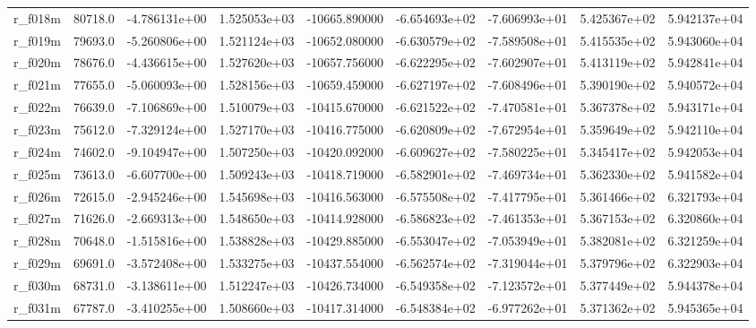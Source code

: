 \documentclass[10pt]{article}
\begin{document}
\begin{landscape}
\begin{longtable}{lrrrrrrrr}
r\_f018m                 &   80718.0 & -4.786131e+00 &  1.525053e+03 & -10665.890000 & -6.654693e+02 & -7.606993e+01 &  5.425367e+02 &  5.942137e+04 \\
r\_f019m                 &   79693.0 & -5.260806e+00 &  1.521124e+03 & -10652.080000 & -6.630579e+02 & -7.589508e+01 &  5.415535e+02 &  5.943060e+04 \\
r\_f020m                 &   78676.0 & -4.436615e+00 &  1.527620e+03 & -10657.756000 & -6.622295e+02 & -7.602907e+01 &  5.413119e+02 &  5.942841e+04 \\
r\_f021m                 &   77655.0 & -5.060093e+00 &  1.528156e+03 & -10659.459000 & -6.627197e+02 & -7.608496e+01 &  5.390190e+02 &  5.940572e+04 \\
r\_f022m                 &   76639.0 & -7.106869e+00 &  1.510079e+03 & -10415.670000 & -6.621522e+02 & -7.470581e+01 &  5.367378e+02 &  5.943171e+04 \\
r\_f023m                 &   75612.0 & -7.329124e+00 &  1.527170e+03 & -10416.775000 & -6.620809e+02 & -7.672954e+01 &  5.359649e+02 &  5.942110e+04 \\
r\_f024m                 &   74602.0 & -9.104947e+00 &  1.507250e+03 & -10420.092000 & -6.609627e+02 & -7.580225e+01 &  5.345417e+02 &  5.942053e+04 \\
r\_f025m                 &   73613.0 & -6.607700e+00 &  1.509243e+03 & -10418.719000 & -6.582901e+02 & -7.469734e+01 &  5.362330e+02 &  5.941582e+04 \\
r\_f026m                 &   72615.0 & -2.945246e+00 &  1.545698e+03 & -10416.563000 & -6.575508e+02 & -7.417795e+01 &  5.361466e+02 &  6.321793e+04 \\
r\_f027m                 &   71626.0 & -2.669313e+00 &  1.548650e+03 & -10414.928000 & -6.586823e+02 & -7.461353e+01 &  5.367153e+02 &  6.320860e+04 \\
r\_f028m                 &   70648.0 & -1.515816e+00 &  1.538828e+03 & -10429.885000 & -6.553047e+02 & -7.053949e+01 &  5.382081e+02 &  6.321259e+04 \\
r\_f029m                 &   69691.0 & -3.572408e+00 &  1.533275e+03 & -10437.554000 & -6.562574e+02 & -7.319044e+01 &  5.379796e+02 &  6.322903e+04 \\
r\_f030m                 &   68731.0 & -3.138611e+00 &  1.512247e+03 & -10426.734000 & -6.549358e+02 & -7.123572e+01 &  5.377449e+02 &  5.944378e+04 \\
r\_f031m                 &   67787.0 & -3.410255e+00 &  1.508660e+03 & -10417.314000 & -6.548384e+02 & -6.977262e+01 &  5.371362e+02 &  5.945365e+04 \\

\end{longtable}
\end{landscape}
\end{document}
